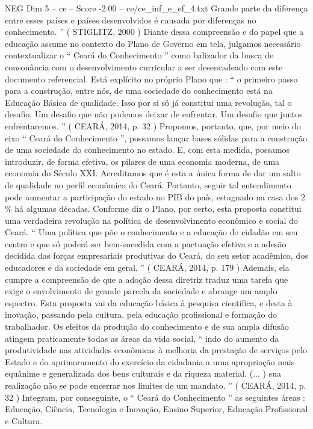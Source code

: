 \begin{textsample}{NEG Dim 5 – ce – Score -2.00 – ce/ce\_inf\_e\_ef\_4.txt}
Grande parte da diferença entre esses países e países desenvolvidos é causada por diferenças no conhecimento. ” ( STIGLITZ, 2000 ) Diante dessa compreensão e do papel que a educação assume no contexto do Plano de Governo em tela, julgamos necessário contextualizar o “ Ceará do Conhecimento ” como balizador da busca de consonância com o desenvolvimento curricular a ser desencadeado com este documento referencial.
Está explícito no próprio Plano que : “ o primeiro passo para a construção, entre nós, de uma sociedade do conhecimento está na Educação Básica de qualidade.
Isso por si só já constitui uma revolução, tal o desafio.
Um desafio que não podemos deixar de enfrentar.
Um desafio que juntos enfrentaremos. ” ( CEARÁ, 2014, p. 32 ) Propomos, portanto, que, por meio do eixo “ Ceará do Conhecimento ”, possamos lançar bases sólidas para a construção de uma sociedade do conhecimento no estado.
E, com esta medida, possamos introduzir, de forma efetiva, os pilares de uma economia moderna, de uma economia do Século XXI.
Acreditamos que é esta a única forma de dar um salto de qualidade no perfil econômico do Ceará.
Portanto, seguir tal entendimento pode aumentar a participação do estado no PIB do país, estagnado na casa dos 2 \% há algumas décadas.
Conforme diz o Plano, por certo, esta proposta constitui uma verdadeira revolução na política de desenvolvimento econômico e social do Ceará. “ Uma política que põe o conhecimento e a educação do cidadão em seu centro e que só poderá ser bem-sucedida com a pactuação efetiva e a adesão decidida das forças empresariais produtivas do Ceará, do seu setor acadêmico, dos educadores e da sociedade em geral. ” ( CEARÁ, 2014, p. 179 ) Ademais, ela cumpre a compreensão de que a adoção dessa diretriz traduz uma tarefa que exige o envolvimento de grande parcela da sociedade e abrange um amplo espectro.
Esta proposta vai da educação básica à pesquisa científica, e desta à inovação, passando pela cultura, pela educação profissional e formação do trabalhador.
Os efeitos da produção do conhecimento e de sua ampla difusão atingem praticamente todas as áreas da vida social, “ indo do aumento da produtividade nas atividades econômicas à melhoria da prestação de serviços pelo Estado e do aprimoramento do exercício da cidadania a uma apropriação mais equânime e generalizada dos bens culturais e da riqueza material. (... ) sua realização não se pode encerrar nos limites de um mandato. ” ( CEARÁ, 2014, p. 32 ) Integram, por conseguinte, o “ Ceará do Conhecimento ” as seguintes áreas : Educação, Ciência, Tecnologia e Inovação, Ensino Superior, Educação Profissional e Cultura.

\end{textsample}

